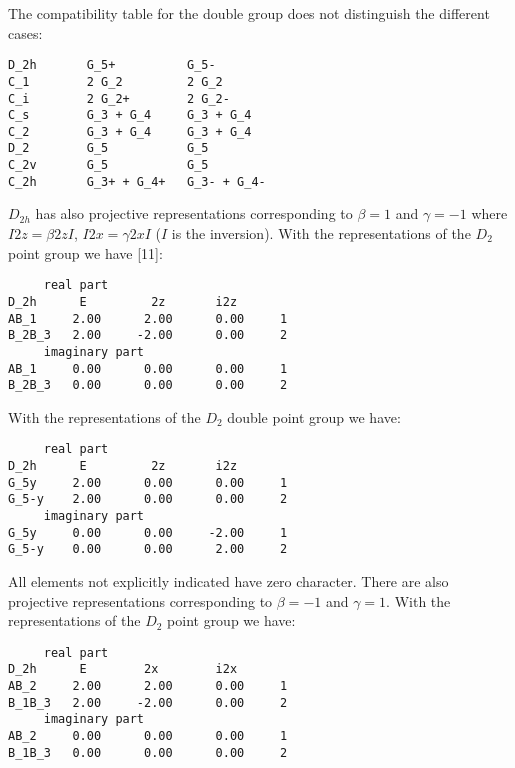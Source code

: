 \documentclass[12pt,a4paper,twoside]{report}
\begin{document}
The compatibility table for the double group does not distinguish the
different cases: 

\begin{tcolorbox}
\begin{footnotesize}
\begin{verbatim}
D_2h       G_5+          G_5-
C_1        2 G_2         2 G_2
C_i        2 G_2+        2 G_2-
C_s        G_3 + G_4     G_3 + G_4
C_2        G_3 + G_4     G_3 + G_4
D_2        G_5           G_5
C_2v       G_5           G_5
C_2h       G_3+ + G_4+   G_3- + G_4-
\end{verbatim}
\end{footnotesize}
\end{tcolorbox}

$D_{2h}$ has also projective representations corresponding to
$\beta=1$ and $\gamma=-1$ where $I 2z = \beta 2z I$, 
$I 2x = \gamma 2x I$ ($I$ is the inversion). With the representations
of the $D_2$ point group we have [11]:

\begin{tcolorbox}
\begin{footnotesize}
\begin{verbatim}
     real part
D_2h      E         2z       i2z
AB_1     2.00      2.00      0.00     1
B_2B_3   2.00     -2.00      0.00     2
     imaginary part
AB_1     0.00      0.00      0.00     1
B_2B_3   0.00      0.00      0.00     2
\end{verbatim}
\end{footnotesize}
\end{tcolorbox}

With the representations of the $D_2$ double point group we have:
\begin{tcolorbox}
\begin{footnotesize}
\begin{verbatim}
     real part
D_2h      E         2z       i2z
G_5y     2.00      0.00      0.00     1
G_5-y    2.00      0.00      0.00     2
     imaginary part
G_5y     0.00      0.00     -2.00     1
G_5-y    0.00      0.00      2.00     2
\end{verbatim}
\end{footnotesize}
\end{tcolorbox}

All elements not explicitly indicated have zero character.
There are also projective representations corresponding to $\beta=-1$ 
and $\gamma=1$. With the representations of the $D_2$ point group we have:

\begin{tcolorbox}
\begin{footnotesize}
\begin{verbatim}
     real part
D_2h      E        2x        i2x
AB_2     2.00      2.00      0.00     1
B_1B_3   2.00     -2.00      0.00     2
     imaginary part
AB_2     0.00      0.00      0.00     1
B_1B_3   0.00      0.00      0.00     2
\end{verbatim}
\end{footnotesize}
\end{tcolorbox}
\end{document}
